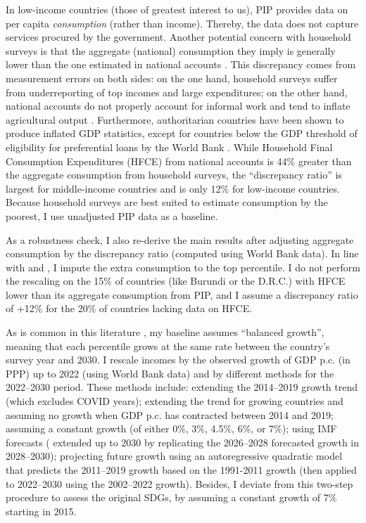 In low-income countries (those of greatest interest to us), PIP provides data on per capita \textit{consumption} (rather than income). Thereby, the data does not capture services procured by the government. Another potential concern with household surveys is that the aggregate (national) consumption they imply is generally lower than the one estimated in national accounts \citep{deaton_measuring_2005,prydz_disparities_2022,hlasny_impact_2022}. This discrepancy comes from measurement errors on both sides: on the one hand, household surveys suffer from underreporting of top incomes and large expenditures; on the other hand, national accounts do not properly account for informal work %
and tend to inflate agricultural output \citep{angrist_why_2021}. 
Furthermore, authoritarian countries have been shown to produce inflated GDP statistics, except for countries below the GDP threshold of eligibility for preferential loans by the World Bank \citep{martinez_how_2022}. %
While Household Final Consumption Expenditures (HFCE) from national accounts is 44\% greater than the aggregate consumption from household surveys, the ``discrepancy ratio'' is largest for middle-income countries and is only 12\% for low-income countries. 
Because household surveys are best suited to estimate consumption by the poorest, I use unadjusted PIP data as a baseline. 

As a robustness check, I also re-derive the main results after adjusting aggregate consumption by the discrepancy ratio (computed using World Bank data). In line with \cite{lakner_global_2013} and \cite{anand_chapter_2015}, I impute the extra consumption to the top percentile. I do not perform the rescaling on the 15\% of countries (like Burundi or the D.R.C.) with HFCE lower than its aggregate consumption from PIP, and I assume a discrepancy ratio of +12\% for the 20\% of countries lacking data on HFCE. 

As is common in this literature \citep{karver_mdgs_2012,hellebrandt_future_2015,bicaba_can_2017}, my baseline assumes ``balanced growth'', meaning that each percentile grows at the same rate between the country's survey year and 2030. 
I rescale incomes by the observed growth of GDP p.c. (in PPP) up to 2022 (using World Bank data) and by different methods for the 2022--2030 period. 
These methods include: extending the 2014--2019 growth trend (which excludes COVID years); extending the trend for growing countries and assuming no growth when GDP p.c. has contracted between 2014 and 2019; assuming a constant growth (of either 0\%, 3\%, 4.5\%, 6\%, or 7\%); using IMF forecasts (\cite{imf_world_2023} extended up to 2030 by replicating the 2026--2028 forecasted growth in 2028--2030); projecting future growth using an autoregressive quadratic model that predicts the 2011--2019 growth based on the 1991-2011 growth (then applied to 2022--2030 using the 2002--2022 growth). Besides, I deviate from this two-step procedure to assess the original SDGs, 
by assuming a constant growth of 7\% starting in 2015.

